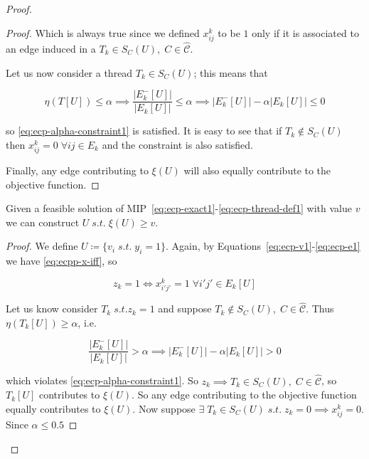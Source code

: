 \begin{proof}
\begin{proof}
		Which is always true since we defined $x_{ij}^{k}$ to be $1$ only if it
		is associated to an edge induced in a $T_k \in S_{C}(U), \; C \in
			\mathcal{\hat{C}} $.

		Let us now consider a thread $T_k \in S_C(U)$; this means that

		\begin{equation}
			\eta(T[U]) \leq \alpha \implies \frac{|E^{-}_{k}[U]|}{|E_{k}[U]|} \leq
			\alpha \implies |E^{-}_{k}[U]| - \alpha |E_{k}[U]| \leq 0
		\end{equation}

		so \autoref{eq:ecp-alpha-constraint1} is satisfied. It is easy to see that
		if $T_k \not\in S_C(U)$ then $x_{ij}^{k} = 0 \; \forall ij \in E_{k}$ and
		the constraint is also satisfied.

		Finally, any edge contributing to $\xi(U)$ will also
		equally contribute to the objective function.
	\end{proof}

	\begin{claim}
		Given a feasible solution of
		MIP~\ref{eq:ecp-exact1}-\ref{eq:ecp-thread-def1} with value $v$ we can
		construct $U \; s.t. \; \xi(U) \geq v$.
	\end{claim}

	\begin{proof}
		We define $U \coloneqq \{ v_{i} \; s.t. \; y_i = 1\}$. Again, by
		Equations~\ref{eq:ecp-v1}-\ref{eq:ecp-e1} we have
		\autoref{eq:ecpp-x-iff}, so

		\begin{equation}
			z_k = 1 \iff x_{i'j'}^{k} = 1 \; \forall i'j'
			\in E_k[U]
		\end{equation}

		Let us know consider $T_k \; s.t. z_k = 1$ and suppose $T_k \not\in
			S_C(U), \; C \in \mathcal{\hat{C}}$. Thus $\eta(T_k[U]) \geq \alpha$,
		i.e.

		\begin{equation}
			\frac{|E^{-}_{k}[U]|}{|E_{k}[U]|} > \alpha \implies |E^{-}_{k}[U]| -
			\alpha |E_{k}[U]| > 0
		\end{equation}

		which violates \autoref{eq:ecp-alpha-constraint1}. So $z_k \implies T_k
			\in S_C(U), \; C \in \mathcal{\hat{C}}$, so $T_k[U]$ contributes to
		$\xi(U)$. So any edge contributing to the objective function equally
		contributes to $\xi(U)$. Now suppose $\exists \; T_k \in S_C(U) \; s.t.
			\; z_k = 0 \implies x_{ij}^{k} = 0$. Since $\alpha \leq 0.5$


\end{proof}
\end{proof}
